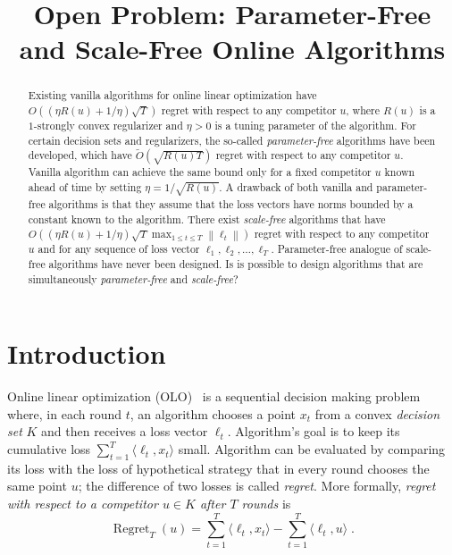 \documentclass{colt2016} %
\title{Open Problem: Parameter-Free and Scale-Free Online Algorithms}
\DeclareMathOperator{\Regret}{Regret}
\newcommand{\norm}[1]{\left\|{#1}\right\|}
\begin{document}
\maketitle

\begin{abstract}
Existing vanilla algorithms for online linear optimization have
$O((\eta R(u) + 1/\eta) \sqrt{T})$ regret with respect to any competitor $u$,
where $R(u)$ is a $1$-strongly convex regularizer and $\eta > 0$ is a
tuning parameter of the algorithm. For certain decision sets and regularizers, the
so-called \emph{parameter-free} algorithms have been developed, which have
$\widetilde O(\sqrt{R(u) T})$ regret with respect to any competitor $u$.
Vanilla algorithm can achieve the same bound only for a fixed competitor
$u$ known ahead of time by setting $\eta = 1/\sqrt{R(u)}$. A drawback of
both vanilla and parameter-free algorithms is that they assume that the loss vectors
have norms bounded by a constant known to the algorithm. There exist \emph{scale-free} algorithms that have
$O((\eta R(u) + 1/\eta) \sqrt{T} \max_{1 \le t \le T} \norm{\ell_t})$
regret with respect to any competitor $u$ and for any sequence of loss
vector $\ell_1, \ell_2, \dots, \ell_T$. Parameter-free analogue of scale-free
algorithms have never been designed. Is is possible to design algorithms that
are simultaneously \emph{parameter-free} and \emph{scale-free}?
\end{abstract}

\section{Introduction}

Online linear optimization (OLO)~\citep{Cesa-Bianchi-Lugosi-2006, Shalev-Shwartz-2011} is a sequential decision making problem where,
in each round $t$, an algorithm chooses a point $x_t$ from a convex
\emph{decision set} $K$ and then receives a loss vector $\ell_t$. Algorithm's
goal is to keep its cumulative loss $\sum_{t=1}^T \langle \ell_t, x_t \rangle$
small. Algorithm can be evaluated by comparing its loss with the loss of
hypothetical strategy that in every round chooses the same point $u$; the
difference of two losses is called \emph{regret}. More formally, \emph{regret
with respect to a competitor $u \in K$ after $T$ rounds} is
$$
\Regret_T(u) = \sum_{t=1}^T \langle \ell_t, x_t \rangle - \sum_{t=1}^T \langle \ell_t, u \rangle \; .
$$
\end{document}
